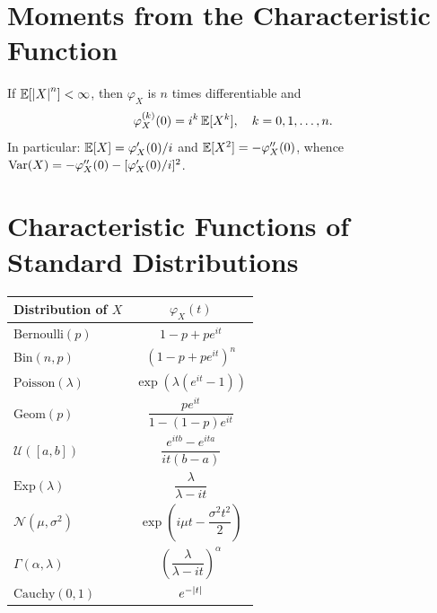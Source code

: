 \section{Moments from the Characteristic Function}

\begin{theorem}
If $\mathbb{E}[\left| X \right|^n] < \infty$, then $\varphi_X$ is $n$ times differentiable and
\[
    \varphi_X^{(k)}(0) = i^k\,\mathbb{E}[X^k], \quad k = 0, 1, \ldots, n.
\]
In particular:
$\mathbb{E}[X] = \varphi_X'(0)/i$ and $\mathbb{E}[X^2] = -\varphi_X''(0)$, whence
$\mathrm{Var}(X) = -\varphi_X''(0) - [\varphi_X'(0)/i]^2$.
\end{theorem}

\section{Characteristic Functions of Standard Distributions}

\begin{keyformulas}[title=\textbf{Table of characteristic functions}]
\begin{center}
\renewcommand{\arraystretch}{1.5}
\begin{tabular}{lc}
    \toprule
    \textbf{Distribution of $X$} & $\varphi_X(t)$ \\
    \midrule
    $\mathrm{Bernoulli}(p)$ & $1-p+pe^{it}$ \\
    $\mathrm{Bin}(n,p)$ & $(1-p+pe^{it})^n$ \\
    $\mathrm{Poisson}(\lambda)$ & $\exp(\lambda(e^{it}-1))$ \\
    $\mathrm{Geom}(p)$ & $\dfrac{pe^{it}}{1-(1-p)e^{it}}$ \\[4pt]
    $\mathcal{U}([a,b])$ & $\dfrac{e^{itb}-e^{ita}}{it(b-a)}$ \\[4pt]
    $\mathrm{Exp}(\lambda)$ & $\dfrac{\lambda}{\lambda-it}$ \\[4pt]
    $\mathcal{N}(\mu,\sigma^2)$ & $\exp\!\left(i\mu t - \dfrac{\sigma^2 t^2}{2}\right)$ \\[4pt]
    $\Gamma(\alpha,\lambda)$ & $\left(\dfrac{\lambda}{\lambda-it}\right)^\alpha$ \\[4pt]
    $\mathrm{Cauchy}(0,1)$ & $e^{-\left| t \right|}$ \\
    \bottomrule
\end{tabular}
\end{center}
\end{keyformulas}

